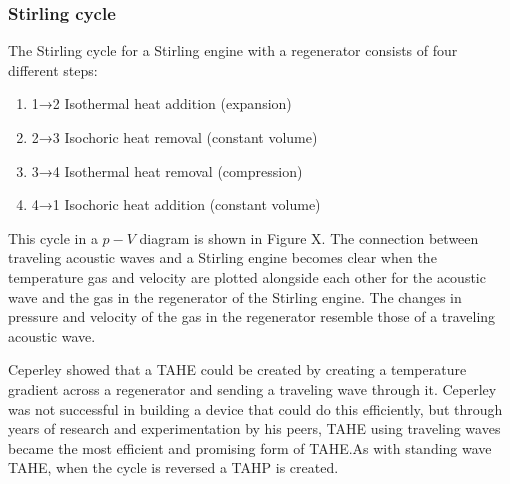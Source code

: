 \documentclass[a4paper]{article}
\newcommand{\newpara}
    {
      \bigbreak{}
      \noindent
    }
\begin{document}
\subsubsection{Stirling cycle}
The Stirling cycle for a Stirling engine with a regenerator consists of four different steps:
\begin{enumerate}[i]
  \item 1→2 Isothermal heat addition (expansion)
  \item 2→3 Isochoric heat removal (constant volume)
  \item 3→4 Isothermal heat removal (compression)
  \item 4→1 Isochoric heat addition (constant volume)
\end{enumerate}
This cycle in a \(p-V\) diagram is shown in Figure X. The connection between traveling acoustic waves and a Stirling engine becomes clear when the temperature gas and velocity are plotted alongside each other for the acoustic wave and the gas in the regenerator of the Stirling engine. The changes in pressure and velocity of the gas in the regenerator resemble those of a traveling acoustic wave.
\newpara{}
Ceperley\cite{ceperleyStirling} showed that a TAHE could be created by creating a temperature gradient across a regenerator and sending a traveling wave through it. Ceperley was not successful in building a device that could do this efficiently, but through years of research and experimentation by his peers, TAHE using traveling waves became the most efficient and promising form of TAHE.\@ As with standing wave TAHE, when the cycle is reversed a TAHP is created.
\end{document}

